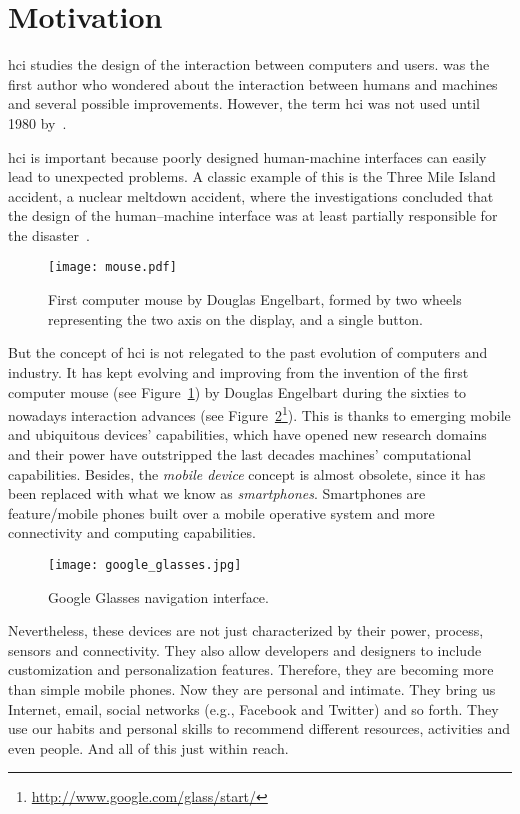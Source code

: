 \section{Motivation}
\label{sec:motivation}

\ac{hci} studies the design of the interaction between computers and users. 
\citet{carlisle1976evaluating} was the first author who wondered about the 
interaction between humans and machines and several possible improvements. 
However, the term \ac{hci} was not used until 1980 
by~\citet{card1980keystroke}.

\ac{hci} is important because poorly designed human-machine interfaces can 
easily lead to unexpected problems. A classic example of this is the Three Mile 
Island accident, a nuclear meltdown accident, where the investigations concluded 
that the design of the human–machine interface was at least partially responsible 
for the disaster~\citep{nuclear2012backgrounder}. 

\begin{figure}[H]
\centering
\texttt{[image: mouse.pdf]}
\caption{First computer mouse by Douglas Engelbart, formed by two wheels 
representing the two axis on the display, and a single button.}
\label{fig:mouse}
\end{figure}

But the concept of \ac{hci} is not relegated to the past evolution of computers 
and industry. It has kept evolving and improving from the invention of the first
computer mouse (see Figure~\ref{fig:mouse}) by Douglas Engelbart during the 
sixties to nowadays interaction advances (see Figure~\ref{fig:google_glasses}\footnote{\url{http://www.google.com/glass/start/}}).
This is thanks to emerging mobile and ubiquitous devices' capabilities, which
have opened new research domains and their power have outstripped the last
decades machines' computational capabilities. Besides, the \textit{mobile device}
concept is almost obsolete, since it has been replaced with what we know as
\textit{smartphones}. Smartphones are feature/mobile phones built over a mobile
operative system and more connectivity and computing capabilities. 

\begin{figure}[H]
\centering
\texttt{[image: google\_glasses.jpg]}
\caption{Google Glasses navigation interface.}
\label{fig:google_glasses}
\end{figure}

Nevertheless, these devices are not just characterized by their power, process,
sensors and connectivity. They also allow developers and designers to include
customization and personalization features. Therefore, they are becoming more
than simple mobile phones. Now they are personal and intimate. They bring us
Internet, email, social networks (e.g., Facebook and Twitter) and so forth. They use
our habits and personal skills to recommend different resources, activities and
even people. And all of this just within reach.

